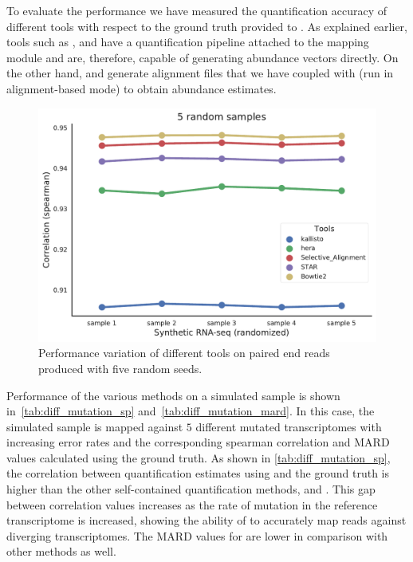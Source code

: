 To evaluate the performance we have measured the quantification accuracy of different tools with respect to the 
ground truth provided to \polyester. As explained earlier, tools such as \kallisto, \hera and \sla have a 
quantification pipeline attached to the mapping module and are, therefore, capable of generating abundance 
vectors directly. On the other hand, \bt and \STAR generate alignment files that we have coupled with \salmon 
(run in alignment-based mode) to obtain abundance estimates.

\begin{figure}
 \centering
 \includegraphics[scale=0.40]{Figures/sla/standard_error}
 \caption[Performance of tools on paired end reads]{Performance variation of 
 different tools on paired end reads produced with five random seeds.}
  \label{fig:random_samples}
\end{figure}

Performance of the various methods on a simulated sample is shown in~\cref{tab:diff_mutation_sp}
and~\cref{tab:diff_mutation_mard}. In this case, 
the simulated sample is mapped against $5$ different mutated transcriptomes with increasing error rates and the 
corresponding spearman correlation and MARD values calculated using the ground truth. As shown in 
\cref{tab:diff_mutation_sp}, the correlation between quantification estimates using \sla and the ground truth is 
higher than the other self-contained quantification methods, \kallisto and \hera. This gap between correlation 
values increases as the rate of mutation in the reference transcriptome is increased, showing the ability of 
\sla to accurately map reads against diverging transcriptomes. The MARD values for \sla are lower in comparison 
with other \nab methods as well.

